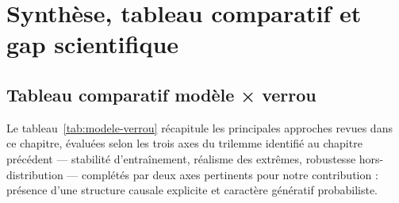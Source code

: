 \documentclass[14pt,a4paper,openany]{extreport}
\theoremstyle{definition}
\begin{document}
\section{Synthèse, tableau comparatif et gap scientifique}
\label{sec:soa-synthese}

\subsection{Tableau comparatif modèle × verrou}
\label{ssec:soa-tableau}

Le tableau~\ref{tab:modele-verrou} récapitule les principales approches revues dans ce chapitre, évaluées selon les trois axes du trilemme identifié au chapitre précédent --- stabilité d'entraînement, réalisme des extrêmes, robustesse hors-distribution --- complétés par deux axes pertinents pour notre contribution : présence d'une structure causale explicite et caractère génératif probabiliste.
\end{document}
